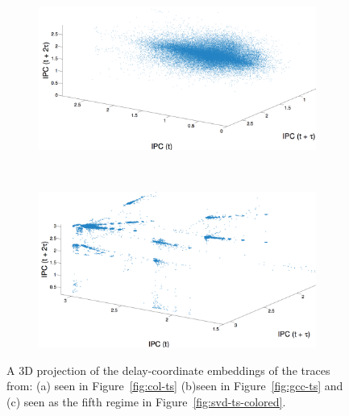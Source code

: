 \begin{figure}
    \begin{subfigure}{\columnwidth}
    \includegraphics[width=\columnwidth]{figs/gcc3dipc.png}
    \caption{\gcc}
    \label{fig:gccEmbedding}
  \end{subfigure} 
  \\
  \begin{subfigure}{\columnwidth}
    \includegraphics[width=\columnwidth]{figs/svd53dipc2.png}
    \caption{\svdfive}
    \label{fig:svdfiveEmbedding}
  \end{subfigure}%
%  
 
   
     \caption{A 3D projection of the delay-coordinate embeddings of the traces
 from: (a) \col seen in Figure~\ref{fig:col-ts} (b)\gcc seen in Figure~\ref{fig:gcc-ts} and (c) \svdfive seen as the fifth regime in Figure~\ref{fig:svd-ts-colored}.
 }
 \label{fig:embedding}
 \end{figure}



